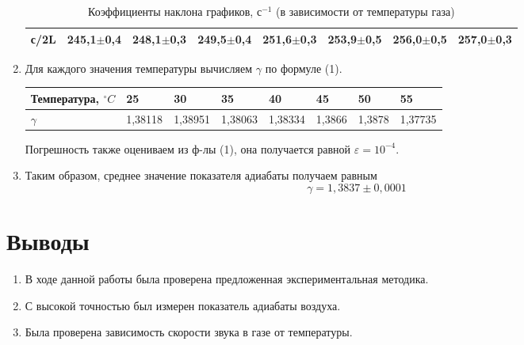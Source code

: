 \documentclass[12pt,a4paper]{article}
\begin{document}
\begin{enumerate}
\begin{table}[!h]
\begin{tabular}{|l|l|l|l|l|l|l|l|}
			\textbf{с/2L} & {\color[HTML]{000000} 245,1$\pm$0,4} & {\color[HTML]{000000} 248,1$\pm$0,3} & {\color[HTML]{000000} 249,5$\pm$0,4} & {\color[HTML]{000000} 251,6$\pm$0,3} & {\color[HTML]{000000} 253,9$\pm$0,5} & {\color[HTML]{000000} 256,0$\pm$0,5} & {\color[HTML]{000000} 257,0$\pm$0,3} \\ \hline
		\end{tabular}
	\caption{Коэффициенты наклона графиков, с$^{-1}$ (в зависимости от температуры газа)}
	\end{table}
	\item Для каждого значения температуры вычисляем $\gamma$ по формуле (1).
		\begin{table}[!h]
			\centering
			\begin{tabular}{|l|l|l|l|l|l|l|l|}
				\hline
				\textbf{Температура, $^\circ C$} & {\color[HTML]{000000} 25} & {\color[HTML]{000000} 30} & {\color[HTML]{000000} 35} & {\color[HTML]{000000} 40} & {\color[HTML]{000000} 45} & {\color[HTML]{000000} 50} & {\color[HTML]{000000} 55} \\ \hline
				\textbf{$\gamma$} & {\color[HTML]{000000} 1,38118} & {\color[HTML]{000000} 1,38951} & {\color[HTML]{000000} 1,38063} & {\color[HTML]{000000} 1,38334} & {\color[HTML]{000000} 1,3866} & {\color[HTML]{000000} 1,3878} & {\color[HTML]{000000} 1,37735} \\ \hline
			\end{tabular}
		\end{table}
	Погрешность также оцениваем из ф-лы (1), она получается равной $\varepsilon = 10^{-4}$.
	\item Таким образом, среднее значение показателя адиабаты получаем равным $$\gamma = 1,3837\pm0,0001$$
	\end{enumerate}
\section{Выводы}
	\begin{enumerate}
		\item В ходе данной работы была проверена предложенная экспериментальная методика.
		\item С высокой точностью был измерен показатель адиабаты воздуха.
		\item Была проверена зависимость скорости звука в газе от температуры.
	\end{enumerate}
\end{document}
